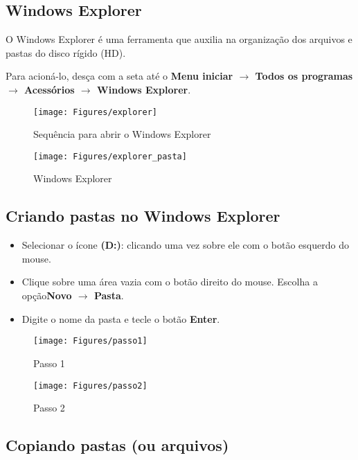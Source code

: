 \documentclass[hidelinks,12pt]{article}
\begin{document}
\subsection{Windows Explorer}

O Windows Explorer é uma ferramenta que auxilia na organização dos arquivos e pastas do disco rígido (HD).


Para acioná-lo, desça com a seta até o {\bf Menu iniciar $\rightarrow$ Todos os programas $\rightarrow$ Acessórios $\rightarrow$ Windows Explorer}.


\begin{figure}[!h]
	\centering
	\texttt{[image: Figures/explorer]}
	\caption{Sequência para abrir o Windows Explorer}
	\label{fig:explorer}
\end{figure}


\begin{figure}[!h]
	\centering
	\texttt{[image: Figures/explorer\_pasta]}
	\caption{Windows Explorer}
	\label{fig:explorer_p}
\end{figure}

\newpage
\subsection{Criando pastas no Windows Explorer}

\begin{itemize}

	\item Selecionar o ícone {\bf(D:)}: clicando uma vez sobre ele com o botão esquerdo do mouse.
	\item Clique sobre uma área vazia com o botão direito do mouse. Escolha a opção{\bf Novo $\rightarrow$ Pasta}.

	\item Digite o nome da pasta e tecle o botão {\bf Enter}.
\end{itemize}

\begin{figure}[!h]
	\centering
	\texttt{[image: Figures/passo1]}
	\caption{Passo 1}
	\label{fig:passo1}
\end{figure}


\begin{figure}[!h]
	\centering
	\texttt{[image: Figures/passo2]}
	\caption{Passo 2}
	\label{fig:passo2}
\end{figure}

\subsection{Copiando pastas (ou arquivos)}
\end{document}

